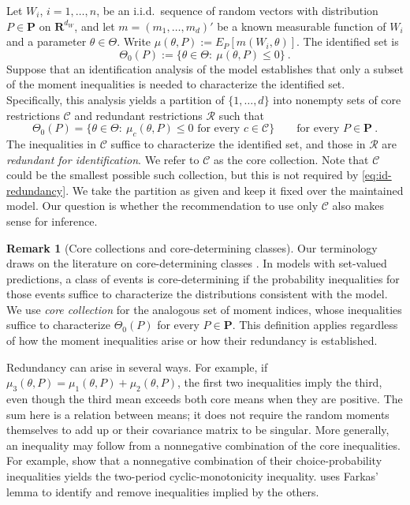 \documentclass[11pt]{article}
\numberwithin{equation}{section}
\theoremstyle{definition}
\newtheorem{remark}{Remark}
\begin{document}
Let $W_i$, $i=1,\dots,n$, be an i.i.d.\ sequence of random vectors with distribution $P\in\mathbf P$ on $\mathbf R^{d_W}$, and let $m=(m_1,\dots,m_d)'$ be a known measurable function of $W_i$ and a parameter $\theta\in\Theta$. Write $\mu(\theta,P):=E_P[m(W_i,\theta)]$. The identified set is
\begin{equation}\label{eq:identified-set}
\Theta_0(P):=\{\theta\in\Theta:\ \mu(\theta,P)\le0\}~.
\end{equation}
Suppose that an identification analysis of the model establishes that only a subset of the moment inequalities is needed to characterize the identified set. Specifically, this analysis yields a partition of $\{1,\dots,d\}$ into nonempty sets of core restrictions $\mathcal C$ and redundant restrictions $\mathcal R$ such that
\begin{equation}\label{eq:id-redundancy}
\Theta_0(P)=\{\theta\in\Theta:\ \mu_c(\theta,P)\le0\text{ for every }c\in\mathcal C\}
\qquad\text{for every }P\in\mathbf P~.
\end{equation}
The inequalities in $\mathcal C$ suffice to characterize the identified set, and those in $\mathcal R$ are \emph{redundant for identification}. We refer to $\mathcal C$ as the core collection. Note that $\mathcal C$ could be the smallest possible such collection, but this is not required by \eqref{eq:id-redundancy}. We take the partition as given and keep it fixed over the maintained model. Our question is whether the recommendation to use only $\mathcal C$ also makes sense for inference.

\begin{remark}[Core collections and core-determining classes]\label{rem:core-determining}
Our terminology draws on the literature on core-determining classes \citep{galichon/henry:11,chesher/rosen:17,luo/wang:18,luo/ponomarev/wang:26}. In models with set-valued predictions, a class of events is core-determining if the probability inequalities for those events suffice to characterize the distributions consistent with the model. We use \emph{core collection} for the analogous set of moment indices, whose inequalities suffice to characterize $\Theta_0(P)$ for every $P\in\mathbf P$. This definition applies regardless of how the moment inequalities arise or how their redundancy is established.
\end{remark}

Redundancy can arise in several ways. For example, if $\mu_3(\theta,P)=\mu_1(\theta,P)+\mu_2(\theta,P)$, the first two inequalities imply the third, even though the third mean exceeds both core means when they are positive. The sum here is a relation between means; it does not require the random moments themselves to add up or their covariance matrix to be singular. More generally, an inequality may follow from a nonnegative combination of the core inequalities. For example, \citet[Section~4.1]{pakes/porter:24} show that a nonnegative combination of their choice-probability inequalities yields the two-period cyclic-monotonicity inequality. \citet[Section~2.4.1]{mbakop:23} uses Farkas' lemma to identify and remove inequalities implied by the others.
\end{document}
